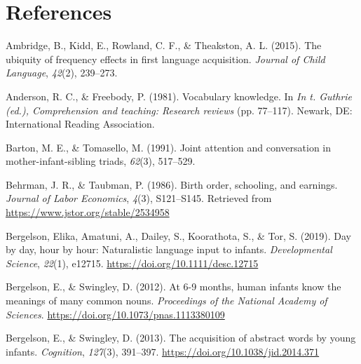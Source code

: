 \documentclass[
  english,
  man,floatsintext]{apa6}
\newlength{\cslhangindent}
\newlength{\cslentryspacingunit} %
\newenvironment{CSLReferences}[2] %
 {%
  \setlength{\parindent}{0pt}
  \ifodd #1
  \let\oldpar\par
  \def\par{\hangindent=\cslhangindent\oldpar}
  \fi
  \setlength{\parskip}{#2\cslentryspacingunit}
 }%
 {}
\begin{document}
\newpage

\hypertarget{references}{%
\section{References}\label{references}}

\begingroup
\setlength{\parindent}{-0.5in}
\setlength{\leftskip}{0.5in}

\hypertarget{refs}{}
\begin{CSLReferences}{1}{0}
\leavevmode{}%
Ambridge, B., Kidd, E., Rowland, C. F., \& Theakston, A. L. (2015). The ubiquity of frequency effects in first language acquisition. \emph{Journal of Child Language}, \emph{42}(2), 239--273.

\leavevmode{}%
Anderson, R. C., \& Freebody, P. (1981). Vocabulary knowledge. In \emph{In t. Guthrie (ed.), Comprehension and teaching: Research reviews} (pp. 77--117). Newark, {DE}: International Reading Association.

\leavevmode{}%
Barton, M. E., \& Tomasello, M. (1991). Joint attention and conversation in mother-infant-sibling triads, \emph{62}(3), 517--529.

\leavevmode{}%
Behrman, J. R., \& Taubman, P. (1986). Birth order, schooling, and earnings. \emph{Journal of Labor Economics}, \emph{4}(3), S121--S145. Retrieved from \url{https://www.jstor.org/stable/2534958}

\leavevmode{}%
Bergelson, Elika, Amatuni, A., Dailey, S., Koorathota, S., \& Tor, S. (2019). Day by day, hour by hour: Naturalistic language input to infants. \emph{Developmental Science}, \emph{22}(1), e12715. \url{https://doi.org/10.1111/desc.12715}

\leavevmode{}%
Bergelson, E., \& Swingley, D. (2012). At 6-9 months, human infants know the meanings of many common nouns. \emph{Proceedings of the National Academy of Sciences}. \url{https://doi.org/10.1073/pnas.1113380109}

\leavevmode{}%
Bergelson, E., \& Swingley, D. (2013). The acquisition of abstract words by young infants. \emph{Cognition}, \emph{127}(3), 391--397. \url{https://doi.org/10.1038/jid.2014.371}


\end{CSLReferences}
\end{document}
